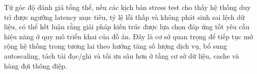 Từ góc độ đánh giá tổng thể, nếu các kịch bản stress test cho thấy hệ thống duy trì được ngưỡng latency mục tiêu, tỷ lệ lỗi thấp và không phát sinh sai lệch dữ liệu, có thể kết luận rằng giải pháp kiến trúc được lựa chọn đáp ứng tốt yêu cầu hiệu năng ở quy mô triển khai của đồ án. Đây là cơ sở quan trọng để tiếp tục mở rộng hệ thống trong tương lai theo hướng tăng số lượng dịch vụ, bổ sung autoscaling, tách tải đọc/ghi và tối ưu sâu hơn ở tầng cơ sở dữ liệu, cache và hàng đợi thông điệp.